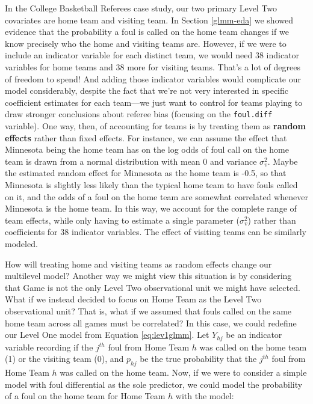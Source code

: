 \documentclass[
]{krantz}
\begin{document}
In the College Basketball Referees case study, our two primary Level Two covariates are home team and visiting team. In Section \ref{glmm-eda} we showed evidence that the probability a foul is called on the home team changes if we know precisely who the home and visiting teams are. However, if we were to include an indicator variable for each distinct team, we would need 38 indicator variables for home teams and 38 more for visiting teams. That's a lot of degrees of freedom to spend! And adding those indicator variables would complicate our model considerably, despite the fact that we're not very interested in specific coefficient estimates for each team---we just want to control for teams playing to draw stronger conclusions about referee bias (focusing on the \texttt{foul.diff} variable). One way, then, of accounting for teams is by treating them as \textbf{random effects} rather than fixed effects. For instance, we can assume the effect that Minnesota being the home team has on the log odds of foul call on the home team is drawn from a normal distribution with mean 0 and variance \(\sigma^{2}_{v}\). Maybe the estimated random effect for Minnesota as the home team is -0.5, so that Minnesota is slightly less likely than the typical home team to have fouls called on it, and the odds of a foul on the home team are somewhat correlated whenever Minnesota is the home team. In this way, we account for the complete range of team effects, while only having to estimate a single parameter (\(\sigma^{2}_{v}\)) rather than coefficients for 38 indicator variables. The effect of visiting teams can be similarly modeled.

How will treating home and visiting teams as random effects change our multilevel model? Another way we might view this situation is by considering that Game is not the only Level Two observational unit we might have selected. What if we instead decided to focus on Home Team as the Level Two observational unit? That is, what if we assumed that fouls called on the same home team across all games must be correlated? In this case, we could redefine our Level One model from Equation \eqref{eq:lev1glmm}. Let \(Y_{hj}\) be an indicator variable recording if the \(j^{th}\) foul from Home Team \(h\) was called on the home team (1) or the visiting team (0), and \(p_{hj}\) be the true probability that the \(j^{th}\) foul from Home Team \(h\) was called on the home team. Now, if we were to consider a simple model with foul differential as the sole predictor, we could model the probability of a foul on the home team for Home Team \(h\) with the model:
\end{document}
